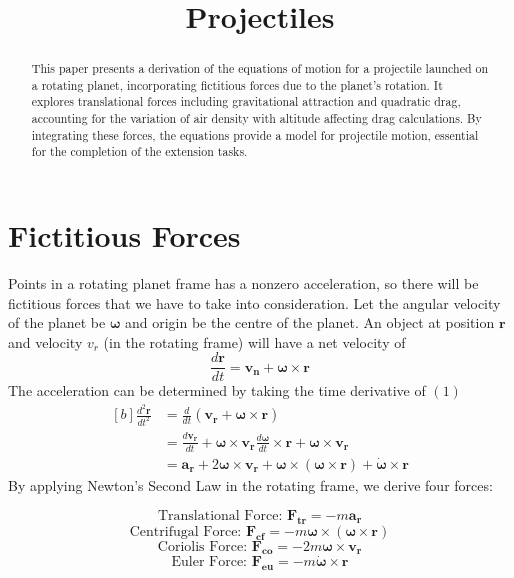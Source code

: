 \documentclass[12pt]{article}
\title{Projectiles}
\newcommand{\bs}[1]{\boldsymbol{#1}}
\newcommand{\om}{\omega}
\begin{document}
\maketitle
\begin{abstract}
This paper presents a derivation of the equations of motion for a projectile launched on a rotating planet, incorporating fictitious forces due to the planet's rotation. It explores translational forces including gravitational attraction and quadratic drag, accounting for the variation of air density with altitude affecting drag calculations. By integrating these forces, the equations provide a model for projectile motion, essential for the completion of the extension tasks.
\end{abstract}
\section{Fictitious Forces}
Points in a rotating planet frame has a nonzero acceleration, so there will be fictitious forces that we have to take into consideration. Let the angular velocity of the planet be $\bs{\om}$ and origin be the centre of the planet. An object at position $\bs{r}$ and velocity $v_r$ (in the rotating frame) will have a net velocity of 
\begin{equation} \frac{d\bs{r}}{dt} = \bs{v_n} + \bs{\om} \times \bs{r} \end{equation}
The acceleration can be determined by taking the time derivative of $\left(1\right)$
\begin{equation} 
\begin{aligned}[b]
\frac{d^2\bs{r}}{dt^2} &= \frac{d}{dt}\left(\bs{v_r} + \bs{\om} \times \bs{r}\right)\\
& = \frac{d\bs{v_r}}{dt} + \bs{\om} \times \bs{v_r} \frac{d\bs{\om}}{dt} \times \bs{r} + \bs{\om} \times \bs{v_r}\\
& = \bs{a_r} +  2\bs{\om} \times \bs{v_r} + \bs{\om} \times \left(\bs{\om} \times \bs{r}\right) + \dot{\bs{\om}} \times \bs{r}
\end{aligned}
\end{equation}
By applying Newton's Second Law in the rotating frame, we derive four forces:
\begin{center}
\begin{equation}\text{Translational Force: } \bs{F_{tr}} = -m\bs{a_r}\end{equation}
\begin{equation}\text{Centrifugal Force: } \bs{F_{cf}} = -m\bs{\om} \times \left(\bs{\om} \times \bs{r}\right)\end{equation}
\begin{equation}\text{Coriolis Force: } \bs{F_{co}} = -2m\bs{\om} \times \bs{v_r}\end{equation}
\begin{equation}\text{Euler Force: } \bs{F_{eu}} = -m\dot{\bs{\om}} \times \bs{r}\end{equation}
\end{center}
\end{document}

